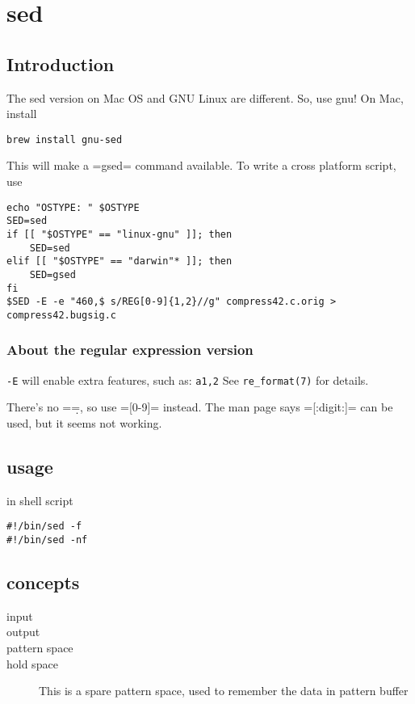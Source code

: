 \section{sed}

\subsection{Introduction}
The sed version on Mac OS and GNU Linux are different.
So, use gnu! On Mac, install
\begin{lstlisting}
brew install gnu-sed
\end{lstlisting}

This will make a =gsed= command available.
To write a cross platform script, use
\begin{lstlisting}
echo "OSTYPE: " $OSTYPE
SED=sed
if [[ "$OSTYPE" == "linux-gnu" ]]; then
    SED=sed
elif [[ "$OSTYPE" == "darwin"* ]]; then
    SED=gsed
fi
$SED -E -e "460,$ s/REG[0-9]{1,2}//g" compress42.c.orig > compress42.bugsig.c
\end{lstlisting}

\subsubsection{About the regular expression version}
\texttt{-E} will enable extra features, such as: \texttt{a{1,2}}
See \verb$re_format(7)$ for details.

There's no =\d=, so use =[0-9]= instead. The man page says =[:digit:]= can be used, but it seems not working.

\subsection{usage}
in shell script

\begin{lstlisting}
#!/bin/sed -f
#!/bin/sed -nf
\end{lstlisting}

\subsection{concepts}
\begin{description}
\item [input]
\item [output]
\item [pattern space]
\item [hold space] This is a spare pattern space, used to remember the
  data in pattern buffer
\end{description}

